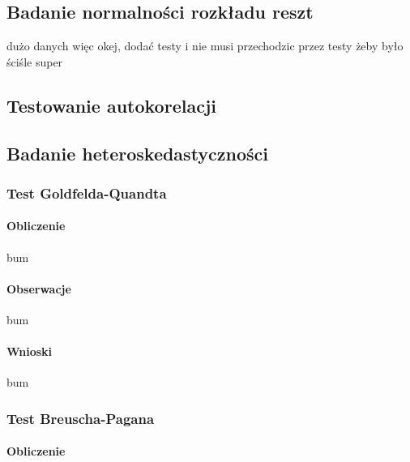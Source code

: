 \documentclass[
  11pt,
]{article}
\begin{document}
\subsection{Badanie normalności rozkładu
reszt}\label{badanie-normalnoux15bci-rozkux142adu-reszt}

dużo danych więc okej, dodać testy i nie musi przechodzic przez testy
żeby było ściśle super

\subsection{Testowanie autokorelacji}\label{testowanie-autokorelacji}

\subsection{Badanie
heteroskedastyczności}\label{badanie-heteroskedastycznoux15bci}

\subsubsection{Test Goldfelda-Quandta}\label{test-goldfelda-quandta}

\paragraph{Obliczenie}\label{obliczenie-6}

bum

\paragraph{Obserwacje}\label{obserwacje-10}

bum

\paragraph{Wnioski}\label{wnioski-10}

bum

\subsubsection{Test Breuscha-Pagana}\label{test-breuscha-pagana}

\paragraph{Obliczenie}\label{obliczenie-7}
\end{document}
